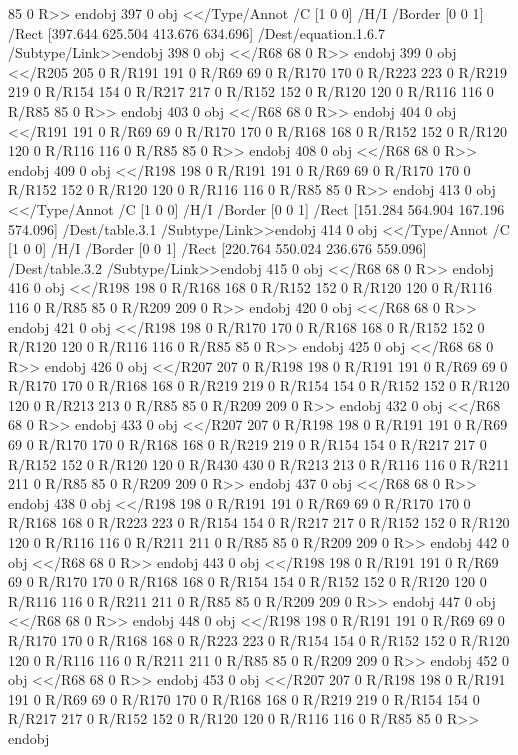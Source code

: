 {{{{{{{{{{{{{{{{{{{{{{{{{{{{85 0 R>>
endobj
397 0 obj
<</Type/Annot
/C [1 0 0]
/H/I
/Border [0 0 1]
/Rect [397.644 625.504 413.676 634.696]
/Dest/equation.1.6.7
/Subtype/Link>>endobj
398 0 obj
<</R68
68 0 R>>
endobj
399 0 obj
<</R205
205 0 R/R191
191 0 R/R69
69 0 R/R170
170 0 R/R223
223 0 R/R219
219 0 R/R154
154 0 R/R217
217 0 R/R152
152 0 R/R120
120 0 R/R116
116 0 R/R85
85 0 R>>
endobj
403 0 obj
<</R68
68 0 R>>
endobj
404 0 obj
<</R191
191 0 R/R69
69 0 R/R170
170 0 R/R168
168 0 R/R152
152 0 R/R120
120 0 R/R116
116 0 R/R85
85 0 R>>
endobj
408 0 obj
<</R68
68 0 R>>
endobj
409 0 obj
<</R198
198 0 R/R191
191 0 R/R69
69 0 R/R170
170 0 R/R152
152 0 R/R120
120 0 R/R116
116 0 R/R85
85 0 R>>
endobj
413 0 obj
<</Type/Annot
/C [1 0 0]
/H/I
/Border [0 0 1]
/Rect [151.284 564.904 167.196 574.096]
/Dest/table.3.1
/Subtype/Link>>endobj
414 0 obj
<</Type/Annot
/C [1 0 0]
/H/I
/Border [0 0 1]
/Rect [220.764 550.024 236.676 559.096]
/Dest/table.3.2
/Subtype/Link>>endobj
415 0 obj
<</R68
68 0 R>>
endobj
416 0 obj
<</R198
198 0 R/R168
168 0 R/R152
152 0 R/R120
120 0 R/R116
116 0 R/R85
85 0 R/R209
209 0 R>>
endobj
420 0 obj
<</R68
68 0 R>>
endobj
421 0 obj
<</R198
198 0 R/R170
170 0 R/R168
168 0 R/R152
152 0 R/R120
120 0 R/R116
116 0 R/R85
85 0 R>>
endobj
425 0 obj
<</R68
68 0 R>>
endobj
426 0 obj
<</R207
207 0 R/R198
198 0 R/R191
191 0 R/R69
69 0 R/R170
170 0 R/R168
168 0 R/R219
219 0 R/R154
154 0 R/R152
152 0 R/R120
120 0 R/R213
213 0 R/R85
85 0 R/R209
209 0 R>>
endobj
432 0 obj
<</R68
68 0 R>>
endobj
433 0 obj
<</R207
207 0 R/R198
198 0 R/R191
191 0 R/R69
69 0 R/R170
170 0 R/R168
168 0 R/R219
219 0 R/R154
154 0 R/R217
217 0 R/R152
152 0 R/R120
120 0 R/R430
430 0 R/R213
213 0 R/R116
116 0 R/R211
211 0 R/R85
85 0 R/R209
209 0 R>>
endobj
437 0 obj
<</R68
68 0 R>>
endobj
438 0 obj
<</R198
198 0 R/R191
191 0 R/R69
69 0 R/R170
170 0 R/R168
168 0 R/R223
223 0 R/R154
154 0 R/R217
217 0 R/R152
152 0 R/R120
120 0 R/R116
116 0 R/R211
211 0 R/R85
85 0 R/R209
209 0 R>>
endobj
442 0 obj
<</R68
68 0 R>>
endobj
443 0 obj
<</R198
198 0 R/R191
191 0 R/R69
69 0 R/R170
170 0 R/R168
168 0 R/R154
154 0 R/R152
152 0 R/R120
120 0 R/R116
116 0 R/R211
211 0 R/R85
85 0 R/R209
209 0 R>>
endobj
447 0 obj
<</R68
68 0 R>>
endobj
448 0 obj
<</R198
198 0 R/R191
191 0 R/R69
69 0 R/R170
170 0 R/R168
168 0 R/R223
223 0 R/R154
154 0 R/R152
152 0 R/R120
120 0 R/R116
116 0 R/R211
211 0 R/R85
85 0 R/R209
209 0 R>>
endobj
452 0 obj
<</R68
68 0 R>>
endobj
453 0 obj
<</R207
207 0 R/R198
198 0 R/R191
191 0 R/R69
69 0 R/R170
170 0 R/R168
168 0 R/R219
219 0 R/R154
154 0 R/R217
217 0 R/R152
152 0 R/R120
120 0 R/R116
116 0 R/R85
85 0 R>>
endobj
}}}}}}}}}}}}}}}}}}}}}}}}}}}}
